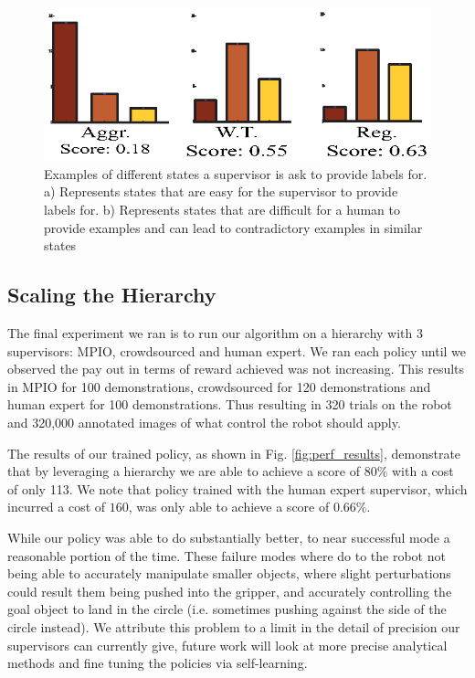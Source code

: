 \documentclass[10pt, conference]{ieeeconf}      %
\begin{document}
\begin{figure}[t]


\includegraphics{f_figs/cost_result.eps}

\caption{\footnotesize  Examples of different states a supervisor is ask to provide labels for. a) Represents states that are easy for the supervisor to provide labels for.  b) Represents states that are difficult for a human to provide examples and can lead to contradictory examples in similar states }
\vspace*{-20pt}
\label{fig:cost_result}
\end{figure}



\subsection{Scaling the Hierarchy}
The final experiment we ran is to run our algorithm on a hierarchy with 3 supervisors: MPIO, crowdsourced and human expert. We ran each policy until we observed the pay out in terms of reward achieved was not increasing. This results in MPIO for 100 demonstrations, crowdsourced for 120 demonstrations and human expert for 100 demonstrations. Thus resulting in 320 trials on the robot and 320,000 annotated images of what control the robot should apply. 

The results of our trained policy, as shown in Fig. \ref{fig:perf_results}, demonstrate that by leveraging a hierarchy we are able to achieve a score of $80\%$ with a cost of only 113. We note that policy trained with the human expert supervisor, which incurred a cost of $160$, was only able to achieve a score of $0.66\%$. 

While our policy was able to do substantially better, to near successful mode a reasonable portion of the time. These failure modes where do to the robot not being able to accurately manipulate smaller objects, where slight perturbations could result them being pushed into the gripper, and accurately controlling the goal object to land in the circle (i.e. sometimes pushing against the side of the circle instead). We attribute this problem to a limit in the detail of precision our supervisors can currently give, future work will look at more precise analytical methods and fine tuning the policies via self-learning. 
\end{document}
